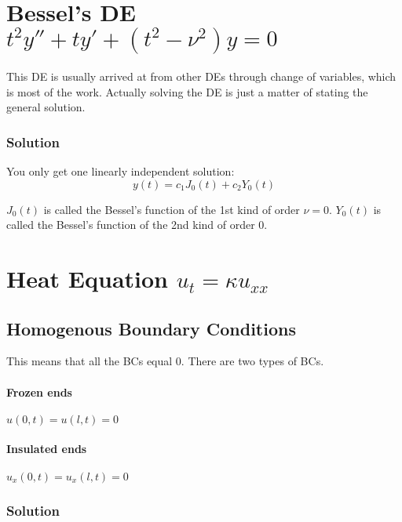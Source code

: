 \documentclass[11pt]{article}
\begin{document}
\section{Bessel's DE $t^2y''+ty'+(t^2-\nu^2)y=0$}
This DE is usually arrived at from other DEs through change of variables, which is most of the work. Actually solving the DE is just a matter of stating the general solution.

\subsubsection*{Solution}
You only get one linearly independent solution:
$$ y(t) = c_1J_0(t) + c_2Y_0(t) $$

$J_0(t)$ is called the Bessel's function of the 1st kind of order $\nu=0$.
$Y_0(t)$ is called the Bessel's function of the 2nd kind of order 0.


\section{Heat Equation $u_t=\kappa u_{xx}$}

\subsection{Homogenous Boundary Conditions}
This means that all the BCs equal 0. There are two types of BCs.

\paragraph{Frozen ends} $u(0,t) = u(l,t) = 0$
\paragraph{Insulated ends} $u_x(0,t) = u_x(l,t) = 0$

\subsubsection*{Solution}
\end{document}
